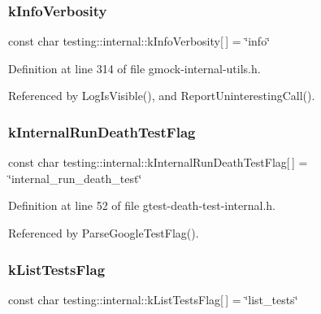 \mbox{\label{namespacetesting_1_1internal_a96274a788ffc75a6dffdfa8aa1f34fb9}} 
\subsubsection{\texorpdfstring{k\+Info\+Verbosity}{kInfoVerbosity}}
{\footnotesize\ttfamily const char testing\+::internal\+::k\+Info\+Verbosity\mbox{[}$\,$\mbox{]} = \char`\"{}info\char`\"{}}



Definition at line 314 of file gmock-\/internal-\/utils.\+h.



Referenced by Log\+Is\+Visible(), and Report\+Uninteresting\+Call().

\mbox{\label{namespacetesting_1_1internal_a8572303d929880adf30db00952e1c45d}} 
\subsubsection{\texorpdfstring{k\+Internal\+Run\+Death\+Test\+Flag}{kInternalRunDeathTestFlag}}
{\footnotesize\ttfamily const char testing\+::internal\+::k\+Internal\+Run\+Death\+Test\+Flag\mbox{[}$\,$\mbox{]} = \char`\"{}internal\+\_\+run\+\_\+death\+\_\+test\char`\"{}}



Definition at line 52 of file gtest-\/death-\/test-\/internal.\+h.



Referenced by Parse\+Google\+Test\+Flag().

\mbox{\label{namespacetesting_1_1internal_a1d3cfebffefbf35f7033d4941493a8ff}} 
\subsubsection{\texorpdfstring{k\+List\+Tests\+Flag}{kListTestsFlag}}
{\footnotesize\ttfamily const char testing\+::internal\+::k\+List\+Tests\+Flag\mbox{[}$\,$\mbox{]} = \char`\"{}list\+\_\+tests\char`\"{}}



